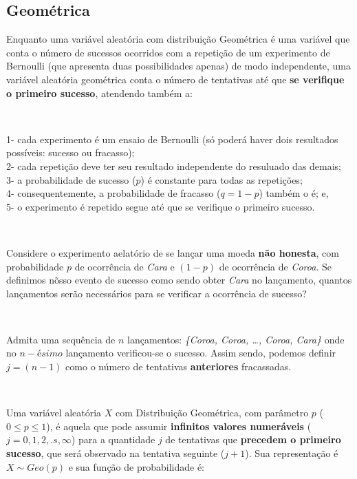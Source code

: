 \documentclass[
]{book}
\begin{document}
\hypertarget{geomuxe9trica}{%
\subsection{Geométrica}\label{geomuxe9trica}}

Enquanto uma variável aleatória com distribuição Geométrica é uma variável que conta o número de sucessos ocorridos com a repetição de um experimento de Bernoulli (que apresenta duas possibilidades apenas) de modo independente, uma variável aleatória geométrica conta o número de tentativas até que \textbf{se verifique o primeiro sucesso}, atendendo também a:

~

1- cada experimento é um ensaio de Bernoulli (só poderá haver dois resultados possíveis: sucesso ou fracasso);\\
2- cada repetição deve ter seu resultado independente do resuluado das demais;\\
3- a probabilidade de sucesso (\(p\)) é constante para todas as repetições;\\
4- consequentemente, a probabilidade de fracasso (\(q=1-p\)) também o é; e,\\
5- o experimento é repetido segue até que se verifique o primeiro sucesso.

~

Considere o experimento aelatório de se lançar uma moeda \textbf{não honesta}, com probabilidade \(p\) de ocorrência de \emph{Cara} e \((1-p)\) de ocorrência de \emph{Coroa}. Se definimos nõsso evento de sucesso como sendo obter \emph{Cara} no lançamento, quantos lançamentos serão necessários para se verificar a ocorrência de sucesso?

~

Admita uma sequência de \(n\) lançamentos: \emph{\{Coroa, Coroa, \ldots, Coroa, Cara\}} onde no \(n-ésimo\) lançamento verificou-se o sucesso. Assim sendo, podemos definir \(j=(n-1)\) como o número de tentativas \textbf{anteriores} fracassadas.

~

Uma variável aleatória \(X\) com Distribuição Geométrica, com parâmetro \(p\) (\(0 \le p \le1\)), é aquela que pode assumir \textbf{infinitos valores numeráveis} (\(j=0,1,2, .s, \infty\)) para a quantidade \(j\) de tentativas que \textbf{precedem o primeiro sucesso}, que será observado na tentativa seguinte (\(j+1\)). Sua representação é \(X\sim Geo(p)\) e sua função de probabilidade é:

\hfill\break
\end{document}
